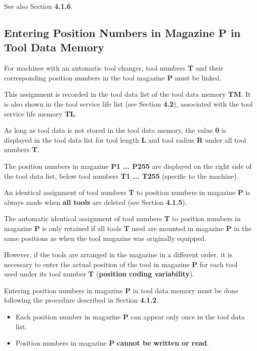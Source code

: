 See also Section \textbf{4.1.6}.

\newpage

\subsection{Entering Position Numbers in Magazine P in Tool Data Memory}

For machines with an automatic tool changer, tool numbers \textbf{T} and their corresponding position numbers in the tool magazine \textbf{P} must be linked.

This assignment is recorded in the tool data list of the tool data memory \textbf{TM}. It is also shown in the tool service life list (see Section \textbf{4.2}), associated with the tool service life memory \textbf{TL}.

As long as tool data is not stored in the tool data memory, the value \textbf{0} is displayed in the tool data list for tool length \textbf{L} and tool radius \textbf{R} under all tool numbers \textbf{T}.

The position numbers in magazine \textbf{P1 ... P255} are displayed on the right side of the tool data list, below tool numbers \textbf{T1 ... T255} (specific to the machine).

An identical assignment of tool numbers \textbf{T} to position numbers in magazine \textbf{P} is always made when \textbf{all tools} are deleted (see Section \textbf{4.1.5}).

The automatic identical assignment of tool numbers \textbf{T} to position numbers in magazine \textbf{P} is only retained if all tools \textbf{T} used are mounted in magazine \textbf{P} in the same positions as when the tool magazine was originally equipped.

However, if the tools are arranged in the magazine in a different order, it is necessary to enter the actual position of the tool in magazine \textbf{P} for each tool used under its tool number \textbf{T} (\textbf{position coding variability}).

Entering position numbers in magazine \textbf{P} in tool data memory must be done following the procedure described in Section \textbf{4.1.2}.

\notes

\begin{itemize}
    \item Each position number in magazine \textbf{P} can appear only once in the tool data list.
    \item Position numbers in magazine \textbf{P} \textbf{cannot be written or read}.
\end{itemize}

